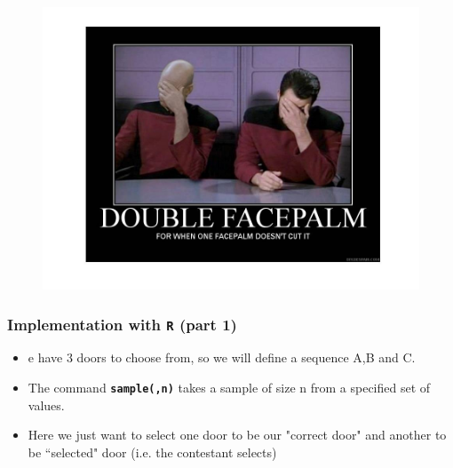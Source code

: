 \documentclass{beamer}
\begin{document}
\begin{frame}
	\begin{figure}
		\centering
		\includegraphics[width=1.17\linewidth]{MontyHall/Slide15}
		
	\end{figure}
	
\end{frame}
\begin{frame}
	
	\frametitle{Implementation with \texttt{R} (part 1)}
	
	\begin{itemize}
\item e have 3 doors to choose from, so we will define a sequence A,B and C. 
\item The command \texttt{\textbf{sample(,n)}} takes a sample of size n from a specified set of values. 
\item Here we just want to select one door to be our "correct door" and another to be ``selected" door (i.e. the contestant selects)
\end{itemize}
	
	
\end{frame}
\end{document}
